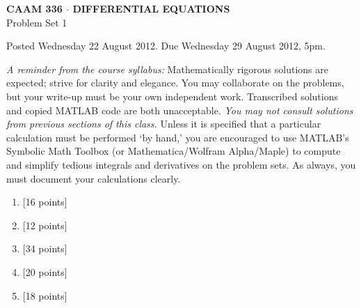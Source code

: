 \documentclass[10pt]{article}
\begin{document}
\vspace*{-5em}
\begin{center}
\large \textsf{\textbf{CAAM 336 $\cdot$ DIFFERENTIAL EQUATIONS}\\[0.5em]
Problem Set 1 }
\end{center}

Posted Wednesday 22 August 2012.  Due Wednesday 29 August 2012, 5pm.

{\small \emph{A reminder from the course syllabus:}  
Mathematically rigorous solutions are expected; strive for clarity and elegance.
You may collaborate on the problems, but your write-up must be your own independent work.
Transcribed solutions and copied MATLAB code are both unacceptable.
\emph{You may not consult solutions from previous sections of this class.}
 Unless it is specified that a particular calculation must be performed `by hand,' you are
encouraged to use MATLAB's Symbolic Math Toolbox (or Mathematica/Wolfram Alpha/Maple)
to compute and simplify tedious integrals and derivatives on the problem sets.
As always, you must document your calculations clearly.}

\begin{enumerate}
\item {[16 points]}\\  

\vspace*{.5em}
\item {[12 points]}\\  

\vspace*{.5em}
\item {[34 points]}\\  

\vspace*{2em}

\item {[20 points]}\\  

\vspace*{2em}
\item {[18 points]}\\  

\end{enumerate}
\end{document}
